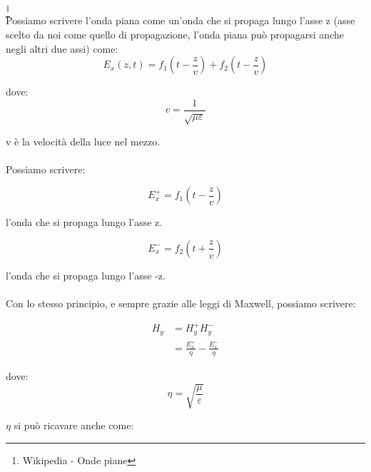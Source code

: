 \footnote{Wikipedia - Onde piane} \\

Possiamo scrivere l'onda piana come un'onda che si propaga 
lungo l'asse z (asse scelto da noi come quello di propagazione, l'onda piana può propagarsi anche negli altri due assi) 
come: \\ 

{\Large \begin{equation}
    E_x (z, t) = f_1 (t-\frac{z}{v}) + f_2 (t-\frac{z}{v}) 
\end{equation}}

dove: 
{
    \Large
    \begin{equation}
        v = \frac{1}{\sqrt{\mu \varepsilon}} 
    \end{equation}
}

v è la velocità della luce nel mezzo. \\ \\ 

Possiamo scrivere: 

{\Large \begin{equation}
    E_x ^{+} = f_1 (t - \frac{z}{v})
\end{equation}}

l'onda che si propaga lungo l'asse z. 

{\Large \begin{equation}
    E_x ^{-} = f_2 (t + \frac{z}{v})
\end{equation}} 

l'onda che si propaga lungo l'asse -z. \\ \\ 


Con lo stesso principio, e sempre grazie alle leggi di Maxwell, possiamo scrivere: 

{\Large \begin{equation}
    \begin{split}
        H_y 
        &= H_y ^{+} H_y ^{-} 
        \\
        &= \frac{E_x ^{+}}{\eta} - \frac{E_x ^{-}}{\eta} 
    \end{split}
\end{equation}}

dove: \\ 

{\Large \begin{equation}
    \eta = \sqrt{\frac{\mu}{\varepsilon}}
\end{equation}}

$\eta$ si può ricavare anche come: 

